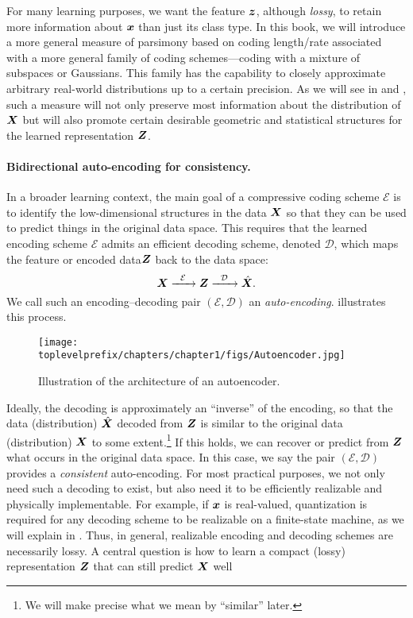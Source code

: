 \documentclass[../../book-main.tex]{subfiles}
\begin{document}
For many learning purposes, we want the feature $\bm{z}$, although \textit{lossy}, to retain more information about $\bm{x}$ than just its class type. In this book, we will introduce a more general measure of parsimony based on coding length/rate associated with a more general family of coding schemes---coding with a mixture of subspaces or Gaussians. This family has the capability to closely approximate arbitrary real-world distributions up to a certain precision. As we will see in  and , such a measure will not only preserve most information about the distribution of $\bm{X}$ but will also promote certain desirable geometric and statistical structures for the learned representation $\bm{Z}$. 


\paragraph{Bidirectional auto-encoding for consistency.}
In a broader learning context, the main goal of a compressive coding scheme $\mathcal{E}$ is to identify the low-dimensional structures in the data $\bm{X}$ so that they can be used to predict things in the original data space. This requires that the learned encoding scheme $\mathcal{E}$ admits an efficient decoding scheme, denoted $\mathcal{D}$, which maps the feature or encoded data$\bm{Z}$ back to the data space:
\begin{equation}
    \bm{X}   \xrightarrow{\hspace{2mm} \mathcal{E}\hspace{2mm}} \bm{Z}  \xrightarrow{\hspace{2mm} \mathcal{D} \hspace{2mm}} \hat {\bm{X}}.
       \label{eqn:auto-encoding}
\end{equation}
We call such an encoding--decoding pair $(\mathcal{E}, \mathcal{D})$ an \textit{auto-encoding}.  illustrates this process.
\begin{figure}
    \centering
    \texttt{[image: \\toplevelprefix/chapters/chapter1/figs/Autoencoder.jpg]}
    \caption{Illustration of the architecture of an autoencoder.}
    \label{fig:autoencoder}
\end{figure}

Ideally, the decoding is approximately an ``inverse'' of the encoding, so that the data (distribution) $\hat {\bm{X}}$ decoded from $\bm{Z}$ is similar to the original data (distribution) $\bm{X}$ to some extent.\footnote{We will make precise what we mean by ``similar'' later.} If this holds, we can recover or predict from $\bm{Z}$ what occurs in the original data space. In this case, we say the pair $(\mathcal{E}, \mathcal{D})$ provides a \textit{consistent} auto-encoding. For most practical purposes, we not only need such a decoding to exist, but also need it to be efficiently realizable and physically implementable. For example, if $\bm{x}$ is real-valued, quantization is required for any decoding scheme to be realizable on a finite-state machine, as we will explain in . Thus, in general, realizable encoding and decoding schemes are necessarily lossy. A central question is how to learn a compact (lossy) representation $\bm{Z}$ that can still predict $\bm{X}$ well
\end{document}
